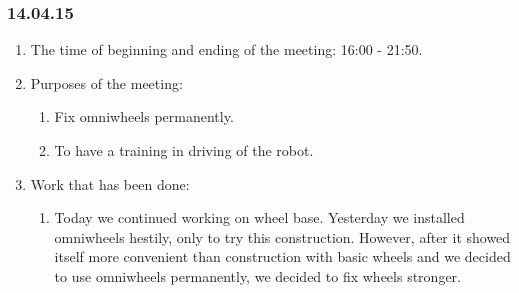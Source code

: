 \subsubsection{14.04.15}
\begin{enumerate}
	
	\item The time of beginning and ending of the meeting: 16:00 - 21:50.
	
	\item Purposes of the meeting: 
	\begin{enumerate}
		
		\item Fix omniwheels permanently.
		
		\item To have a training in driving of the robot.
		
	\end{enumerate}

	\item Work that has been done:
	\begin{enumerate}
		
		\item Today we continued working on wheel base. Yesterday we installed omniwheels hestily, only to try this construction. However, after it showed itself more convenient than construction with basic wheels and we decided to use omniwheels permanently, we decided to fix wheels stronger.
		

\end{enumerate}
\end{enumerate}
